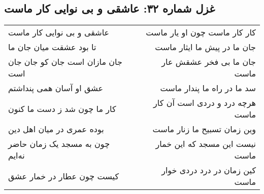 \begin{center}
\section*{غزل شماره ۳۲: عاشقی و بی نوایی کار ماست}
\label{sec:032}
\begin{longtable}{l p{0.5cm} r}
عاشقی و بی نوایی کار ماست
&&
کار کار ماست چون او یار ماست
\\
تا بود عشقت میان جان ما
&&
جان ما در پیش ما ایثار ماست
\\
جان مازان است جان کو جان جان است
&&
جان ما بی فخر عشقش عار ماست
\\
عشق او آسان همی پنداشتم
&&
سد ما در راه ما پندار ماست
\\
کار ما چون شد ز دست ما کنون
&&
هرچه درد و دردی است آن کار ماست
\\
بوده عمری در میان اهل دین
&&
وین زمان تسبیح ما زنار ماست
\\
چون به مسجد یک زمان حاضر نه‌ایم
&&
نیست این مسجد که این خمار ماست
\\
کیست چون عطار در خمار عشق
&&
کین زمان در درد دردی خوار ماست
\\
\end{longtable}
\end{center}
